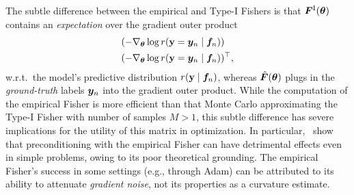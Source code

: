 The subtle difference between the empirical and Type-I Fishers is that
${\bm{F}}^\text{I}({\bm{\theta}})$ contains an \emph{expectation} over the gradient
outer product
\begin{align*}
  &(-\nabla_{{\bm{\theta}}} \log r({\mathbf{y}} = {\bm{y}}_n \mid {\bm{f}}_n)) \\
  &(-\nabla_{{\bm{\theta}}} \log r({\mathbf{y}} = {\bm{y}}_n \mid {\bm{f}}_n))^{\top},
\end{align*}
w.r.t.~the model's predictive distribution $r({\mathbf{y}} \mid {\bm{f}}_n)$,
whereas $\hat{{\bm{F}}}({\bm{\theta}})$ plugs in the \emph{ground-truth} labels ${\bm{y}}_n$
into the gradient outer product. While the computation of the empirical Fisher
is more efficient than that Monte Carlo approximating the Type-I Fisher with
number of samples $M > 1$, this subtle difference
has severe implications for the utility of this matrix in optimization.
In particular,~\citet{kunstner2019limitations} show that preconditioning with
the empirical Fisher can have detrimental effects even in simple problems,
owing to its poor theoretical grounding. The empirical Fisher's success
in some settings (e.g., through Adam) can be attributed to its ability to attenuate
\emph{gradient noise}, not its properties as a curvature estimate.
